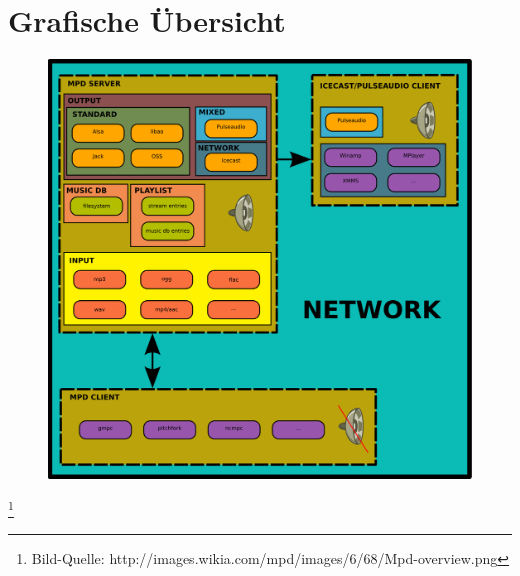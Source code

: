 \newpage
\section{Grafische Übersicht}

\begin{figure}[h]
\centering
\includegraphics[scale=0.6]{Mpd-overview.png}
\end{figure}
\footnote{Bild-Quelle: http://images.wikia.com/mpd/images/6/68/Mpd-overview.png}

